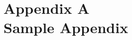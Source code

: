 \documentclass[11pt]{report}         %
\begin{document}
\chapter*{Appendix A\\Sample Appendix}
\label{chap:appendix}


 

                    



\begin{thesisauthorvita}                      
\end{thesisauthorvita}               
\end{document}
